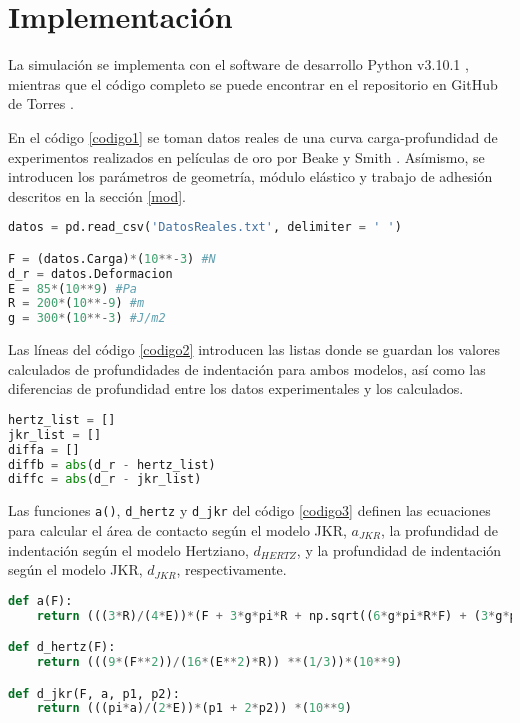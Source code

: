 \documentclass[final,6p,times,twocolumn]{elsarticle}
\begin{document}
\section{Implementaci\'on}
La simulaci\'on se implementa con el software de desarrollo Python v3.10.1 \cite{PY}, mientras que el c\'odigo completo se puede encontrar en el repositorio en GitHub de Torres \cite{jorge1}.

En el c\'odigo \ref{codigo1} se toman datos reales de una curva carga-profundidad de experimentos realizados en pel\'iculas de oro por Beake y Smith \cite{BEAKE2002}. As\'imismo, se introducen los par\'ametros de geometr\'ia, m\'odulo el\'astico y trabajo de adhesi\'on descritos en la secci\'on \ref{mod}.

\begin{lstlisting}[caption=Datos Experimentales y Par\'ametros de Operaci\'on, label=codigo1, language=Python]
datos = pd.read_csv('DatosReales.txt', delimiter = ' ')

F = (datos.Carga)*(10**-3) #N
d_r = datos.Deformacion
E = 85*(10**9) #Pa
R = 200*(10**-9) #m
g = 300*(10**-3) #J/m2
\end{lstlisting}

Las l\'ineas del c\'odigo \ref{codigo2} introducen las listas donde se guardan los valores calculados de profundidades de indentaci\'on para ambos modelos, as\'i como las diferencias de profundidad entre los datos experimentales y los calculados.

\begin{lstlisting}[caption=Listas de Profundidades de Indentaci\'on y Diferencias, label=codigo2, language=Python]
hertz_list = []
jkr_list = []
diffa = []
diffb = abs(d_r - hertz_list)
diffc = abs(d_r - jkr_list)
\end{lstlisting}

Las funciones \texttt{a()}, \texttt{d\_hertz} y \texttt{d\_jkr} del c\'odigo \ref{codigo3} definen las ecuaciones para calcular el \'area de contacto seg\'un el modelo JKR, $a_{JKR}$, la profundidad de indentaci\'on seg\'un el modelo Hertziano, $d_{HERTZ}$, y la profundidad de indentaci\'on seg\'un el modelo JKR, $d_{JKR}$, respectivamente.

\begin{lstlisting}[caption=Funciones de Ecuaciones de los Modelos, label=codigo3, language=Python]
def a(F):
    return (((3*R)/(4*E))*(F + 3*g*pi*R + np.sqrt((6*g*pi*R*F) + (3*g*pi*R)**2)))**(1/3)

def d_hertz(F):
    return (((9*(F**2))/(16*(E**2)*R)) **(1/3))*(10**9)

def d_jkr(F, a, p1, p2):
    return (((pi*a)/(2*E))*(p1 + 2*p2)) *(10**9)
\end{lstlisting}
\end{document}
